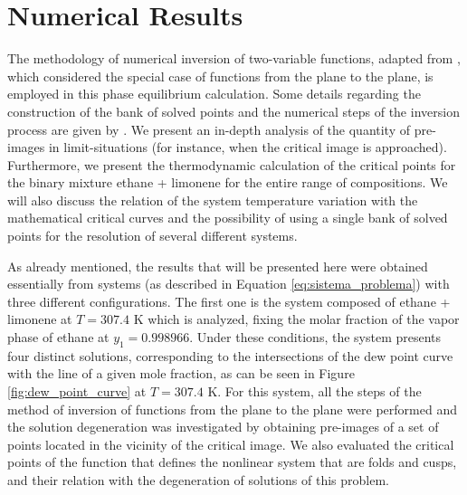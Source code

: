 \documentclass[journal=iecred,manuscript=article]{achemso}
\theoremstyle{definition}
\theoremstyle{remark}
\begin{document}
%

\section{Numerical Results}

The methodology of numerical inversion of two-variable functions, adapted from \citet{malta}, which considered the special case of functions from the plane to the plane, is employed in this phase equilibrium calculation. Some details regarding the construction of the bank of solved points and the numerical steps of the inversion process are given by \citet{ireme}. We present an in-depth analysis of the quantity of pre-images in limit-situations (for instance, when  the critical image is approached). Furthermore, we present the thermodynamic calculation of the critical points for the binary mixture ethane + limonene for the entire range of compositions. We will also discuss the relation of the system temperature variation with the mathematical critical curves and the possibility of using a single bank of solved points for the resolution of several different systems.

As already mentioned, the results that will be presented here were obtained essentially from systems (as described in Equation \ref{eq:sistema_problema}) with three different configurations. The first one is the system composed of ethane + limonene at $ T = 307.4 $ K which is analyzed, fixing the molar fraction of the vapor phase of ethane at $ y_{1} = 0.998966 $. Under these conditions, the system presents four distinct solutions, corresponding to the intersections of the dew point curve with the line of a given mole fraction, as can be seen in Figure \ref{fig:dew_point_curve} at $ T = 307.4 $ K. For this system, all the steps of the method of inversion of functions from the plane to the plane were performed and the solution degeneration was investigated by obtaining pre-images of a set of points located in the vicinity of the critical image. We also evaluated the critical points of the function that defines the nonlinear system that are folds and cusps, and their relation with the degeneration of solutions of this problem.
\end{document}
